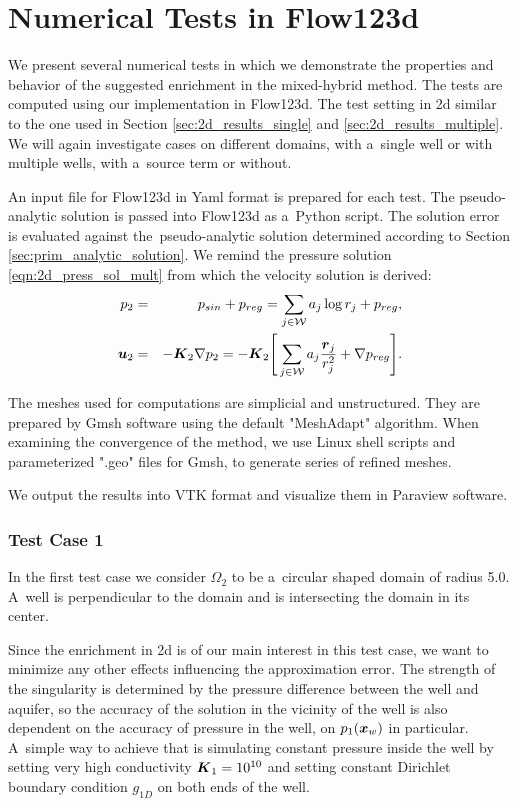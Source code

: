 \section{Numerical Tests in Flow123d}
We present several numerical tests in which we demonstrate the properties and behavior of the suggested enrichment in the mixed-hybrid method.
The tests are computed using our implementation in Flow123d.
The test setting in 2d similar to the one used in Section \ref{sec:2d_results_single} and \ref{sec:2d_results_multiple}.
We will again investigate cases on different domains, with a~single well or with multiple wells, with a~source term or without.

An input file for Flow123d in Yaml format is prepared for each test.
The pseudo-analytic solution is passed into Flow123d as a~Python script.
The solution error is evaluated against the~pseudo-analytic solution determined according
to Section \ref{sec:prim_analytic_solution}. We remind the pressure solution \eqref{eqn:2d_press_sol_mult} from which the velocity solution is derived:
\begin{eqnarray}
p_2 &=& p_{sin} + p_{reg} = \sum\limits_{j\in\mathcal{W}} a_j\log r_j + p_{reg}, \label{eqn:2d_press_solution}\\
\mathbf{\boldsymbol{u}}_2 &=& -\mathbf{\boldsymbol{K}}_2 \nabla p_2 = - \mathbf{\boldsymbol{K}}_2 \Bigg[ \sum\limits_{j\in\mathcal{W}} a_j\frac{\mathbf{\boldsymbol{r}}_j}{r_j^2} + \nabla p_{reg} \Bigg].  \label{eqn:2d_vel_solution}
\end{eqnarray}

The meshes used for computations are simplicial and unstructured.
They are prepared by Gmsh software using the default "MeshAdapt" algorithm.
When examining the convergence of the method, we use Linux shell scripts and parameterized ".geo" files for Gmsh,
to generate series of refined meshes.

We output the results into VTK format and visualize them in Paraview software. 

\subsubsection{Test Case 1}
In the first test case we consider $\Omega_2$ to be a~circular shaped domain of radius 5.0.
A~well is perpendicular to the domain and is intersecting the domain in its center.

Since the enrichment in 2d is of our main interest in this test case, we want to minimize any other effects
influencing the approximation error. The strength of the singularity is determined by the pressure difference
between the well and aquifer, so the accuracy of the solution in the vicinity of the well is also dependent
on the accuracy of pressure in the well, on $p_1(\mathbf{\boldsymbol{x}}_w)$ in particular.
A~simple way to achieve that is simulating constant pressure inside the well by setting very high conductivity $\mathbf{\boldsymbol{K}}_1=10^{10}$
and setting constant Dirichlet boundary condition $g_{1D}$ on both ends of the well.

